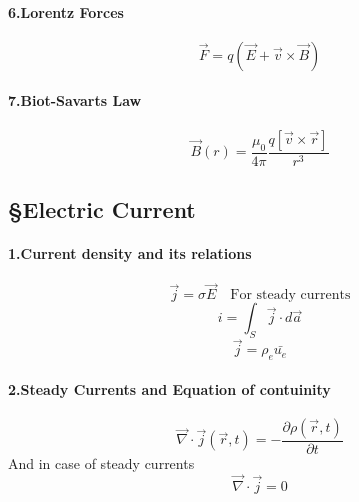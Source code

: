 \documentclass[a4paper]{article}
\numberwithin{equation}{subsection}  %
\begin{document}
\paragraph{6.Lorentz Forces}
\begin{equation}
\vec{F} = q(\vec{E}+\vec{v}\times \vec{B})
\end{equation}
\paragraph{7.Biot-Savarts Law}
\begin{equation}
\vec{B}(r) = \frac{\mu _0}{4\pi}  \frac{q[\vec{v}\times \vec{r}]}{r^3}
\end{equation}
\paragraph{}%
\paragraph{}\begin{center}
\subsection*{\S Electric Current}
\end{center}

\paragraph{1.Current density and its relations} 
\begin{equation}
\vec{j} = \sigma \vec{E} \quad\text{For steady currents}
\end{equation}
\begin{equation}
i = \int_{S} \vec{j}\cdot d\vec{a}
\end{equation}
\begin{equation}
\vec{j} = \rho _e \bar{u_e}
\end{equation}
\paragraph{2.Steady Currents and Equation of contuinity}
\begin{equation}
\vec{\nabla}\cdot \vec{j}(\vec{r},t) = - \frac{\partial \rho(\vec{r},t)}{\partial t}
\end{equation}
And in case of steady currents
\begin{equation}
\vec{\nabla}\cdot \vec{j} =0
\end{equation}
\end{document}
